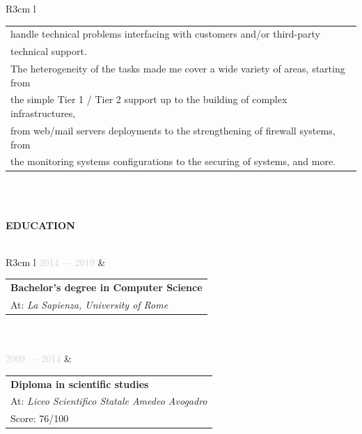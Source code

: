 \documentclass{article}
\begin{document}
\begin{tabular}{ R{3cm} l }
\begin{tabular}[l]{@{}l@{}}
		handle technical problems interfacing with customers and/or third-party \\
		technical support. \\
		The heterogeneity of the tasks made me cover a wide variety of areas, starting from \\
		the simple Tier 1 / Tier 2 support up to the building of complex infrastructures, \\
		from web/mail servers deployments to the strengthening of firewall systems, from \\
		the monitoring systems configurations to the securing of systems, and more.
	\end{tabular} \\\\ \hfill
\end{tabular}

\textbf{\textcolor{deepblue}{EDUCATION}} \\\\ \hfill
\begin{tabular}{ R{3cm} l }
	\textcolor{lightgray}{2014 — 2019} & \begin{tabular}[l]{@{}l@{}}
	\textbf{Bachelor's degree in Computer Science} \\
	At: \textit{La Sapienza, University of Rome} \\
\end{tabular} \\\\ \hfill
\textcolor{lightgray}{2009 — 2014}  & \begin{tabular}[l]{@{}l@{}}
\textbf{Diploma in scientific studies} \\
At: \textit{Liceo Scientifico Statale Amedeo Avogadro} \\
Score: 76/100
\end{tabular} \\\\ \hfill
\end{tabular}

\newpage
\end{document}
